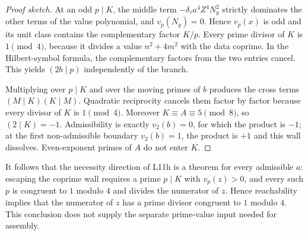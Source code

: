 \begin{proof}[Proof sketch]
At an odd $p\mid K$, the middle term
$-\delta_\tau a^4Z^4N_g^2$ strictly dominates the other terms of the
value polynomial, and $v_p(N_g)=0$.  Hence $v_p(x)$ is odd and its unit
class contains the complementary factor $K/p$.  Every prime divisor of
$K$ is $1\pmod4$, because it divides a value $n^2+4m^2$ with the data
coprime.  In the Hilbert-symbol formula, the complementary factors from
the two entries cancel.  This yields $(2b\mid p)$ independently of the
branch.

Multiplying over $p\mid K$ and over the moving primes of $b$ produces
the cross terms $(M\mid K)(K\mid M)$.  Quadratic reciprocity cancels
them factor by factor because every divisor of $K$ is $1\pmod4$.
Moreover $K\equiv A\equiv5\pmod8$, so $(2\mid K)=-1$.  Admissibility is
exactly $v_2(b)=0$, for which the product is $-1$; at the first
non-admissible boundary $v_2(b)=1$, the product is $+1$ and this wall
dissolves.  Even-exponent primes of $A$ do not enter $K$.
\end{proof}

It follows that the necessity direction of L11h is a theorem for every
admissible $a$: escaping the coprime wall requires a prime $p\mid K$
with $v_p(z)>0$, and every such $p$ is congruent to $1$ modulo $4$ and
divides the numerator of $z$.  Hence reachability implies that the
numerator of $z$ has a prime divisor congruent to $1$ modulo $4$.
This conclusion does not supply the separate prime-value input needed
for assembly.
